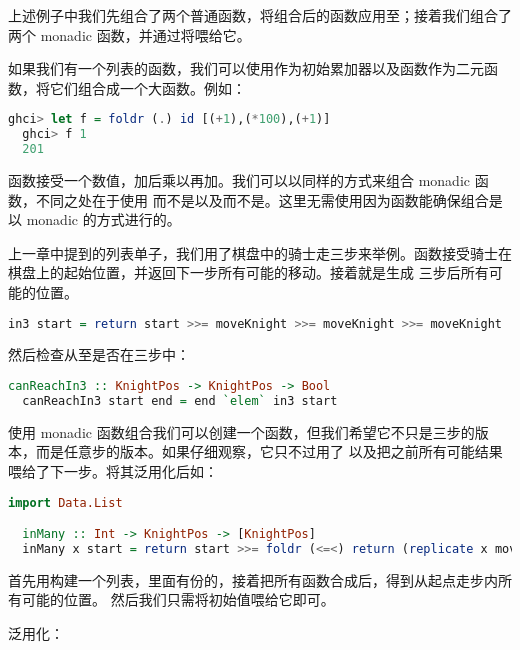\documentclass[./main.tex]{subfiles}
\begin{document}
上述例子中我们先组合了两个普通函数，将组合后的函数应用至；接着我们组合了两个 monadic 函数，并通过\acode{>>=}将喂给它。

如果我们有一个列表的函数，我们可以使用作为初始累加器以及函数作为二元函数，将它们组合成一个大函数。例如：

\begin{lstlisting}[language=Haskell]
  ghci> let f = foldr (.) id [(+1),(*100),(+1)]
  ghci> f 1
  201
\end{lstlisting}

函数接受一个数值，加后乘以再加。我们可以以同样的方式来组合 monadic 函数，不同之处在于使用\acode{<=<}
而不是以及而不是。这里无需使用因为\acode{<=<}函数能确保组合是以 monadic 的方式进行的。

上一章中提到的列表单子，我们用了棋盘中的骑士走三步来举例。函数接受骑士在棋盘上的起始位置，并返回下一步所有可能的移动。接着就是生成
三步后所有可能的位置。

\begin{lstlisting}[language=Haskell]
  in3 start = return start >>= moveKnight >>= moveKnight >>= moveKnight
\end{lstlisting}

然后检查从至是否在三步中：

\begin{lstlisting}[language=Haskell]
  canReachIn3 :: KnightPos -> KnightPos -> Bool
  canReachIn3 start end = end `elem` in3 start
\end{lstlisting}

使用 monadic 函数组合我们可以创建一个函数，但我们希望它不只是三步的版本，而是任意步的版本。如果仔细观察，它只不过用了
\acode{>>=}以及把之前所有可能结果喂给了下一步。将其泛用化后如：

\begin{lstlisting}[language=Haskell]
  import Data.List

  inMany :: Int -> KnightPos -> [KnightPos]
  inMany x start = return start >>= foldr (<=<) return (replicate x moveKnight)
\end{lstlisting}

首先用构建一个列表，里面有份的，接着把所有函数合成后，得到从起点走步内所有可能的位置。
然后我们只需将初始值喂给它即可。

泛用化：
\end{document}
